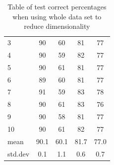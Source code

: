 \documentclass[conference,onecolumn]{IEEEtran}
\begin{document}
\begin{table}[!htb]
\begin{minipage}{.4\linewidth}
\begin{tabular}{lcccc}
			3 &  90 &  60 & 81 & 77 \\
			4 &  90 &  59 & 82 & 77 \\
			5 &  90 &  61 & 81 & 77 \\
			6 &  89 &  60 & 81 & 77 \\
			7 &  91 &  59 & 83 & 78 \\
			8 &  90 &  61 & 83 & 76 \\
			9 &  90 &  58 & 81 & 77 \\
			10 &  90 & 61 & 82 & 77 \\
			\hline
			mean & 90.1 & 60.1 & 81.7 & 77.0 \\
			std.dev & 0.1 & 1.1 & 0.6 & 0.7\\
			\hline
		\end{tabular}
		\caption{Table of test correct percentages when using whole data set to reduce dimensionality}
	\end{minipage}
	\label{tab: t1}
\end{table}
\end{document}
